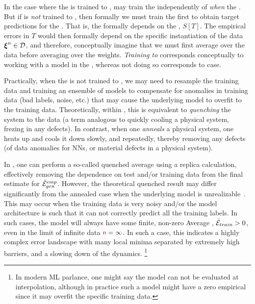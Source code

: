 In the case where the \Teacher is trained to \Interpolation, may train the \Student 
independently of \emph{when} the \Teacher.  
But if \Teacher is \emph{not} trained to \Interpolation, then formally we must train the \Teacher
first to obtain target predictions for the \Student.  That is, the \Student formally
depends on the \Teacher, $S[T]$.
The empirical errors in $T$ would then formally depend on the specific instantiation of the data  $\boldsymbol{\xi}^{n}\in\mathcal{D}$,
and therefore, conceptually imagine that we must first average over the data
before averaging over the weights.
\emph{Training to \Interpolation} corresponds conceptually to working with a model
in the \AnnealedApproximation, whereas not doing so corresponds to \Quenched case.

Practically, when the \Teacher is not trained to \Interpolation, 
we may need to resample the training data and training an ensemble of models to compensate for anomalies in training data (bad labels, noise, etc.) that may cause the underlying model to overfit to the training data.
Theoretically, within \SMOG, this is equivalent to \emph{quenching} the system to the data (a term analogous to quickly cooling a physical system, frezing in any defects).
In contrast, when one \emph{anneals} a physical system, one heats up and cools it down slowly, and repeatedly, thereby removing any defects (of data anomalies for NNs, or material defects in a physical system).

In \STATMECH, one can perform a so-called quenched average using a replica calculation,
effectively removing the dependence on test and/or training data
from the final estimate for $\bar{\mathcal{E}}^{emp}_{gen}$.
However, the theoretical quenched result may differ significantly from the annealed case when the underlying model is unrealizable~\cite{SST92}. 
This may occur when the training data is very noisy and/or the model architecture is such that it can not correctly predict all the training labels.
In such cases, the model will always have some finite, non-zero Average \TrainingError, $\bar{\mathcal{E}}_{train} > 0$,
even in the \LargeN limit of infinite data ${\color{red}\sf{n}}=\infty$. In such a case, this indicates
a highly complex error landscape with many local minima separated by extremely high barriers,
and a slowing down of the dynamics.%
\footnote{In modern ML parlance, one might say the model can not be evaluated at interpolation, although 
in practice such a model might have a zero empirical \TrainingError since it may overfit the specific training data.}

